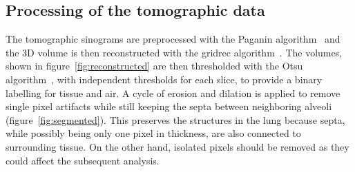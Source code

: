 \subsection{Processing of the tomographic data}\label{sec:tomoprocessing}
The tomographic sinograms are preprocessed with the Paganin
algorithm~\parencite{Paganin_2002} and
the 3D volume is then reconstructed with the gridrec
algorithm~\parencite{Marone:pp5022}. The volumes, shown in
figure~\ref{fig:reconstructed} are then thresholded with the Otsu
algorithm~\parencite{Otsu_1979}, with independent thresholds for each slice, to
provide a binary labelling for tissue and air. A cycle of
erosion and dilation is applied to remove single pixel artifacts while still
keeping the septa between neighboring alveoli (figure~\ref{fig:segmented}).
This preserves the structures in the lung because septa, while possibly
being only one pixel in thickness, are also connected to surrounding tissue.
On the other hand, isolated pixels should be removed as they could affect
the subsequent analysis.

